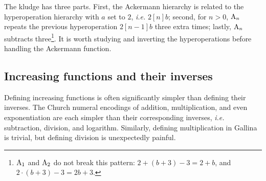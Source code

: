 The kludge has three parts. First, the Ackermann hierarchy is related
to the hyperoperation hierarchy with $a$ set to $2$, \emph{i.e.} $2[n]b$;
second, for $n>0$, $\text{A}_n$ repeats the previous hyperoperation $2[n-1]b$
three extra times;
lastly, $\text{A}_n$ subtracts three\footnote{$\text{A}_{1}$ and $\text{A}_{2}$ do not break this pattern: $2 + (b + 3) - 3 = 2 + b$, and $2 \cdot (b + 3) - 3 = 2b + 3$.}.
It is worth studying and inverting the hyperoperations before handling the Ackermann function.





\subsection{Increasing functions and their inverses}
\label{sec:incfuncinv}
Defining increasing functions is often significantly simpler than defining their inverses.
The Church numeral encodings of addition, multiplication, and even exponentiation
are each simpler than their corresponding inverses, \emph{i.e.} subtraction, division, and logarithm. Similarly, defining multiplication in Gallina~\cite{coq} is trivial, but defining division is unexpectedly painful.\\[5pt]

